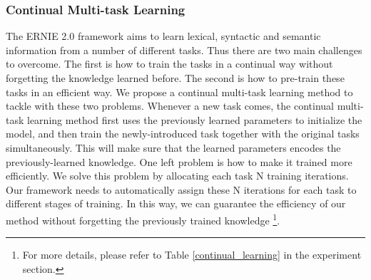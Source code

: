 \documentclass[letterpaper]{article} \usepackage{aaai20}  \usepackage{times}  \usepackage{helvet} \usepackage{courier}  \usepackage[hyphens]{url}  \usepackage{graphicx} \usepackage{makecell}
\begin{document}
\subsubsection{Continual Multi-task Learning}
The ERNIE 2.0 framework aims to learn lexical, syntactic and semantic information from a number of different tasks. Thus there are two main challenges to overcome. The first is how to train the tasks in a continual way without forgetting the knowledge learned before. The second is how to pre-train these tasks in an efficient way. We propose a continual multi-task learning method to tackle with these two problems. Whenever a new task comes, the continual multi-task learning method first uses the previously learned parameters to initialize the model, and then train the newly-introduced task together with the original tasks simultaneously. This will make sure that the learned parameters encodes the previously-learned knowledge. One left problem is how to make it trained more efficiently. We solve this problem by allocating each task N training iterations. Our framework needs to automatically assign these N iterations for each task to different stages of training. In this way, we can guarantee the efficiency of our method without forgetting the previously trained knowledge \footnote{For more details, please refer to Table \ref{continual_learning} in the experiment section.}. 
\end{document}
